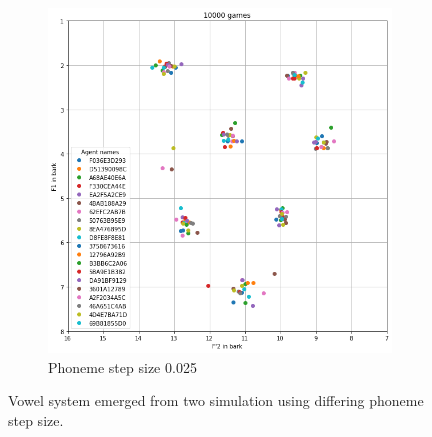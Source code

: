 \begin{figure}[ht]
\begin{subfigure}{.45\textwidth}
        \centering
        \includegraphics[width=\textwidth]{images/results/step_size_025.png}
        \captionsetup{width=0.9\linewidth}
        \captionsetup{justification=centering}
        \caption{Phoneme step size 0.025}
    \end{subfigure}
    \captionsetup{width=0.8\linewidth}
    \captionsetup{justification=centering}
    \caption{Vowel system emerged from two simulation using differing phoneme step size.}
    \label{fig:bdb_smaller_step}
\end{figure}

\clearpage
